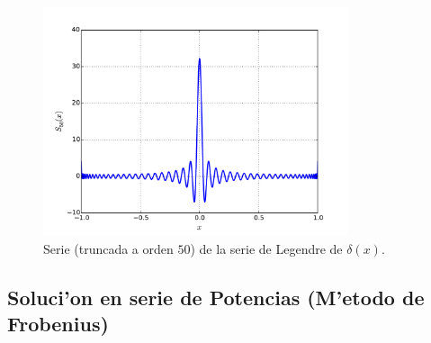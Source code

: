 \begin{figure}[H]
\centering
\includegraphics[angle=0,width=0.8\textwidth]{figs/fig-Legendre-serie-Delta.pdf}
\caption{Serie (truncada a orden $50$) de la serie de Legendre de $\delta(x)$.}
\label{fig-DSL}
\end{figure}

\subsection{Soluci'on en serie de Potencias (M'etodo de Frobenius)}\label{sec:FrobLeg}

